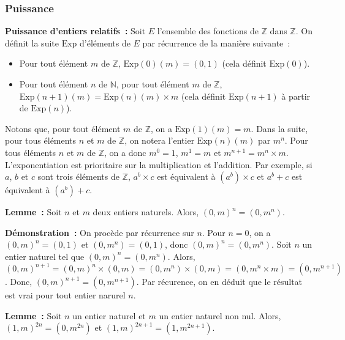 \done

\subsubsection{Puissance}

\noindent\textbf{Puissance d'entiers relatifs :} Soit $E$ l'ensemble des fonctions de $\mathbb{Z}$ dans $\mathbb{Z}$. 
    On définit la suite $\mathrm{Exp}$ d'éléments de $E$ par récurrence de la manière suivante : 
    \begin{itemize}[nosep]
        \item Pour tout élément $m$ de $\mathbb{Z}$, $\mathrm{Exp}(0)(m) = (0,1)$ (cela définit $\mathrm{Exp}(0)$).
        \item Pour tout élément $n$ de $\mathbb{N}$, pour tout élément $m$ de $\mathbb{Z}$, $\mathrm{Exp}(n+1)(m) = \mathrm{Exp}(n)(m) \times m$ (cela définit $\mathrm{Exp}(n+1)$ à partir de $\mathrm{Exp}(n)$).
    \end{itemize}
    Notons que, pour tout élément $m$ de $\mathbb{Z}$, on a $\mathrm{Exp}(1)(m) = m$. 
    Dans la suite, pour tous éléments $n$ et $m$ de $\mathbb{Z}$, on notera l'entier $\mathrm{Exp}(n)(m)$ par $m^n$. 
    Pour tous éléments $n$ et $m$ de $\mathbb{Z}$, on a donc $m^0=1$, $m^1 = m$ et $m^{n+1} = m^n \times m$. 
    L'exponentiation est prioritaire sur la multiplication et l'addition. 
    Par exemple, si $a$, $b$ et $c$ sont trois éléments de $\mathbb{Z}$, $a^b \times c$ est équivalent à $(a^b) \times c$ et $a^b + c$ est équivalent à $(a^b) + c$.

\medskip

\noindent\textbf{Lemme :} Soit $n$ et $m$ deux entiers naturels. 
    Alors, $(0,m)^n = (0,m^n)$.

\medskip

\noindent\textbf{Démonstration :} On procède par récurrence sur $n$.
    Pour $n = 0$, on a $(0,m)^n = (0,1)$ et $(0,m^n) = (0,1)$, donc $(0,m)^n = (0,m^n)$.
    Soit $n$ un entier naturel tel que $(0,m)^n = (0,m^n)$. 
    Alors, $(0,m)^{n+1} = (0,m)^n \times (0,m) = (0,m^n) \times (0,m) = (0, m^n \times m) = (0, m^{n+1})$. 
    Donc, $(0,m)^{n+1} = (0,m^{n+1})$.
    Par récurence, on en déduit que le résultat est vrai pour tout entier narurel $n$.

   \done 

\medskip

\noindent\textbf{Lemme :} Soit $n$ un entier naturel et $m$ un entier naturel non nul. 
    Alors, $(1,m)^{2n} = (0,m^{2n})$ et $(1,m)^{2n+1} = (1,m^{2n+1})$.

